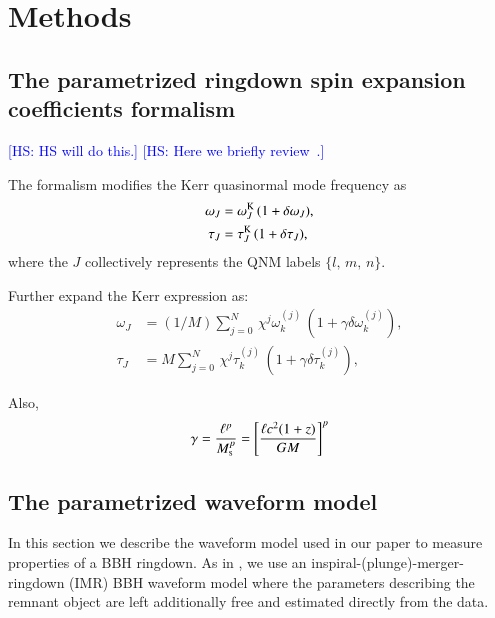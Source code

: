 \documentclass[twocolumn,prd,aps,superscriptaddress,preprintnumbers,tightenlines,showpacs,nofootinbib,eqsecnum,amsfonts,amsmath,longbibliography]{revtex4-1}
\newcommand{\hs}[1]{{\textcolor{blue}{{[HS: #1]}} }}
\begin{document}
\section{Methods}
\label{sec:method}

\subsection{The parametrized ringdown spin expansion coefficients formalism}
\label{sec:review_parspec}

\hs{HS will do this.}
\hs{Here we briefly review~\cite{Maselli:2019mjd,Carullo:2021dui}.}

The formalism modifies the Kerr quasinormal mode frequency as
%
\begin{subequations}
\begin{align}
\omega_{J} &= \omega^{\rm K}_{J} \, (1 + \delta \omega_{J}), \\
\tau_{J}   &= \tau^{\rm K}_{J}   \, (1 + \delta \tau_{J}),
\end{align}
\label{eq:general_deviation}
\end{subequations}
%
where the $J$ collectively represents the QNM labels $\{l,\, m,\, n\}$.

Further expand the Kerr expression as:
%
\begin{subequations}
\begin{align}
\omega_{J} &= (1/M) \sum_{j = 0}^{N} \, \chi^{j} \omega^{(j)}_{k} \, \left( 1 + \gamma \delta \omega^{(j)}_{k} \right), \\
\tau_{J}   &= M     \sum_{j = 0}^{N} \, \chi^{j} \tau^{(j)}_{k}   \, \left( 1 + \gamma \delta \tau^{(j)}_{k} \right),
\end{align}
\label{eq:kerr_expansion}
\end{subequations}

Also,
%
\begin{equation}
\gamma
%
= \frac{\ell^{p}}{M_{\rm s}^{p}}
%
= \left[
\frac{\ell c^2 (1 + z)}{G M}
\right]^{p}
\label{eq:def_gamma}
\end{equation}

\subsection{The parametrized waveform model}
\label{sec:review_pSEOB}



In this section we describe the waveform model used in our paper to measure properties of a BBH ringdown. As in \cite{Brito:2018rfr,Ghosh:2021mrv}, we use an inspiral-(plunge)-merger-ringdown (IMR) BBH waveform model where the parameters describing the remnant object are left additionally free and estimated directly from the data.
\end{document}
